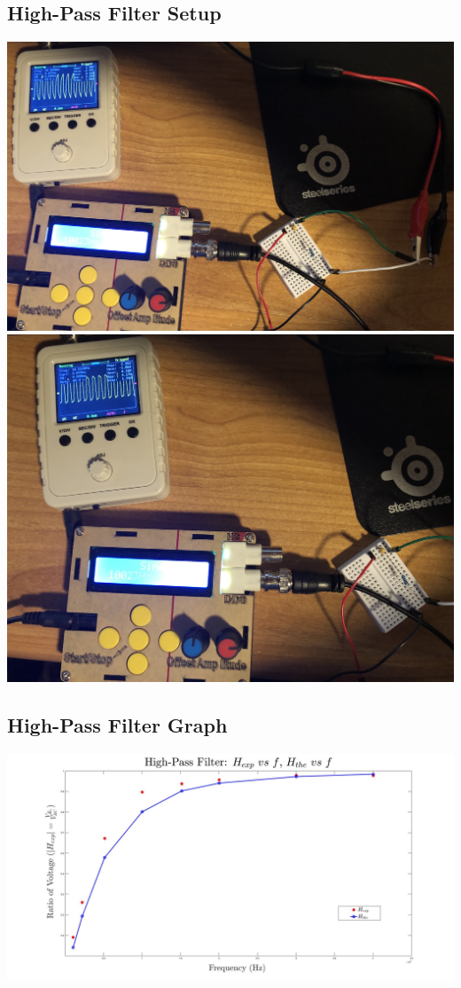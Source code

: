 \documentclass{article}
\begin{document}
\begin{center}
  \subsection*{High-Pass Filter Setup}
  \includegraphics[scale=0.066]{Vrc.jpeg}
  \includegraphics[scale=0.06]{Vr.jpeg}
\end{center}
\begin{center}
  \subsection*{High-Pass Filter Graph}
  \includegraphics[scale=0.2]{graph1.jpg}
\end{center}
\end{document}
